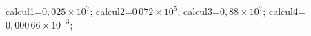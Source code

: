 \documentclass[exercice]{thedocument}%
\begin{document}
%
    \>calcul1=$0,025\times 10^7$;%
    \>calcul2=$0\,072\times 10^5$;%
    \>calcul3=$0,88\times 10^7$;%
    \>calcul4=$0,000\,66\times 10^{-3}$;%
\end{document}
